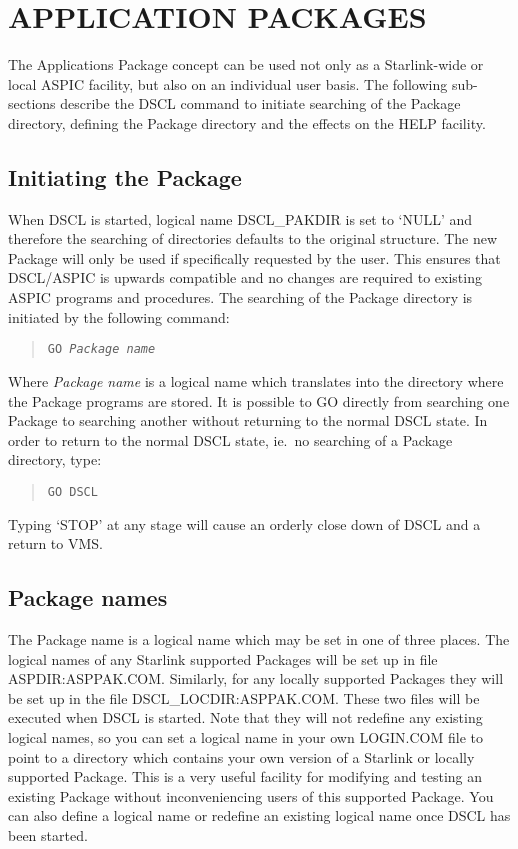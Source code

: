 \section {APPLICATION PACKAGES}

The Applications Package concept can be used not only as a Starlink-wide or
local ASPIC facility, but also on an individual user basis.
The following sub-sections describe the DSCL command to initiate searching of
the Package directory, defining the Package directory and the effects on the
HELP facility.
\subsection {Initiating the Package}
When DSCL is started, logical name DSCL\_PAKDIR is set to `NULL' and
therefore the searching of directories defaults to the original structure.
The new Package will only be used if specifically requested by the user.
This ensures that DSCL/ASPIC is upwards compatible and no changes are required
to existing ASPIC programs and procedures.
The searching of the Package directory is initiated by the following command:
\begin{quote}
{\tt GO {\em Package name}}
\end{quote}
Where {\em Package name} is a logical name which translates into the directory
where the Package programs are stored.
It is possible to GO directly from searching one Package to searching another
without returning to the normal DSCL state.
In order to return to the normal DSCL state, ie.\ no searching of a Package
directory, type:
\begin{quote}
{\tt GO DSCL}
\end{quote}
Typing `STOP' at any stage will cause an orderly close down of DSCL and a return
to VMS.
\subsection {Package names}
The Package name is a logical name which may be set in one of three places.
The logical names of any Starlink supported Packages will be set up in file
ASPDIR:ASPPAK.COM.
Similarly, for any locally supported Packages they will be set up in the file
DSCL\_LOCDIR:ASPPAK.COM.
These two files will be executed when DSCL is started.
Note that they will not redefine any existing logical names, so you can set
a logical name in your own LOGIN.COM file to point to a directory which
contains your own version of a Starlink or locally supported Package.
This is a very useful facility for modifying and testing an existing Package
without inconveniencing users of this supported Package.
You can also define a logical name or redefine an existing logical name once
DSCL has been started.
